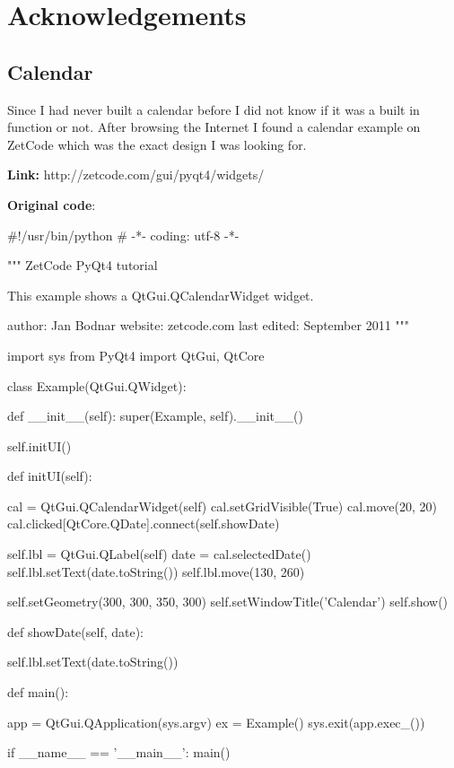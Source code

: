 \section{Acknowledgements}

\subsection{Calendar}

Since I had never built a calendar before I did not know if it was a built in function or not. After browsing the Internet I found a calendar example on ZetCode which was the exact design I was looking for. 

\textbf{Link:} http://zetcode.com/gui/pyqt4/widgets/

\textbf{Original code}:

\begin{python}
#!/usr/bin/python
# -*- coding: utf-8 -*-

"""
ZetCode PyQt4 tutorial 

This example shows a QtGui.QCalendarWidget widget.

author: Jan Bodnar
website: zetcode.com 
last edited: September 2011
"""

import sys
from PyQt4 import QtGui, QtCore

class Example(QtGui.QWidget):
    
    def __init__(self):
        super(Example, self).__init__()
        
        self.initUI()
    
    
    def initUI(self):      

        cal = QtGui.QCalendarWidget(self)
        cal.setGridVisible(True)
        cal.move(20, 20)
        cal.clicked[QtCore.QDate].connect(self.showDate)
        
        self.lbl = QtGui.QLabel(self)
        date = cal.selectedDate()
        self.lbl.setText(date.toString())
        self.lbl.move(130, 260)
        
        self.setGeometry(300, 300, 350, 300)
        self.setWindowTitle('Calendar')
        self.show()
        
    def showDate(self, date):     
    
        self.lbl.setText(date.toString())
    
    
def main():
    
    app = QtGui.QApplication(sys.argv)
    ex = Example()
    sys.exit(app.exec_())


if __name__ == '__main__':
    main()
\end{python}

